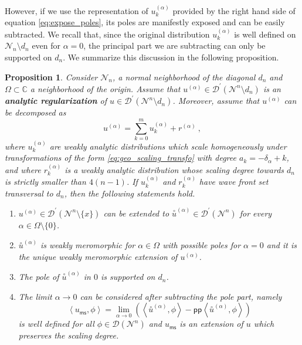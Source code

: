 \documentclass[11pt]{book}
\newcommand{\pp}{\mathsf{pp}}
\newcommand{\ms}{\mathsf{ms}}
\newcommand{\sm}[1]{\left\langle#1\right\rangle}
\newcommand{\exte}[1]{\overset{\circ}{#1}}
\newcommand{\Dcal}{\mathcal{D}}
\newcommand{\Ncal}{\mathcal{N}}
\newcommand{\Cbb}{\mathbb{C}}
\theoremstyle{break}
\newtheorem{proposition}{Proposition}[chapter]
\begin{document}
However, if we use the representation of $u^{(\alpha)}_k$ provided by the right hand side of equation \eqref{eq:expose_poles}, its poles are manifestly exposed and can be easily subtracted. We recall that, since the original distribution $u^{(\alpha)}_k$ is well defined on $\Ncal_n\setminus d_n$ even for $\alpha=0$, the principal part we are subtracting can only be supported on $d_n$. We summarize this discussion in the following proposition.



\begin{proposition}\label{prop:regularization}
Consider $\Ncal_n$, a normal neighborhood of the diagonal $d_n$ and $\Omega \subset \Cbb$ a neighborhood of the origin. Assume that $u^{(\alpha)}\in\Dcal^\prime(\Ncal^n\setminus d_n)$ is an \textbf{analytic regularization} of $u\in\Dcal^\prime(\Ncal^n\setminus d_n)$. Moreover, assume that $u^{(\alpha)}$ can be decomposed as 
%
\begin{equation*}
u^{(\alpha)} = \sum_{k=0}^m u^{(\alpha)}_k + r^{(\alpha)} \ ,
\end{equation*}
%
where $u^{(\alpha)}_k$ are weakly analytic distributions which scale homogeneously under transformations of the form \eqref{eq:geo_scaling_transfo} with degree $a_k = -\delta_\alpha + k$, and where $r^{(\alpha)}_k$ is a weakly analytic distribution whose scaling degree towards $d_n$ is strictly smaller than $4(n-1)$. 
If $u^{(\alpha)}_k$ and $r^{(\alpha)}_k$ have wave front set transversal to $d_n$, then the following statements hold.
%
\begin{enumerate}
\item\label{item:1_regularization} $u^{(\alpha)} \in \Dcal^\prime(\Ncal^n\setminus \{ x\})$ can be extended to $\exte{u}^{(\alpha)} \in \Dcal^\prime(\Ncal^n)$ for every $\alpha \in \Omega \setminus \{0\}$.
%
\item\label{item:2_regularization} $\exte{u}^{(\alpha)}$ is weakly meromorphic for $\alpha \in \Omega$ with possible poles for $\alpha=0$ and it is the unique weakly meromorphic extension of $u^{(\alpha)}$.
%
\item\label{item:3_regularization} The pole of $\exte{u}^{(\alpha)}$ in $0$ is supported on $d_n$.
%
\item\label{item:4_regularization} The limit $\alpha \to 0$ can be considered after subtracting the pole part, namely
%
\begin{equation*}
\sm{ u_\ms, \phi } = \lim_{\alpha \to 0} \left( \sm{ \exte{u}^{(\alpha)} , \phi } - \pp\sm{ \exte{u}^{(\alpha)} , \phi } \right) 
\end{equation*}
%
is well defined for all $\phi \in \Dcal(\Ncal^n)$ and $u_\ms$ is an extension of $u$ which preserves the scaling degree.
\end{enumerate}
%
\end{proposition}
\end{document}
